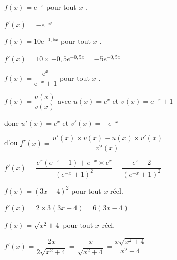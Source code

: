 \documentclass[11pt,a4paper]{article}  %
\begin{document}
\begin{enumMet}
	\item $f(x)=\mathrm{e}^{-x}$ pour tout $x$ .
	\begin{corrBox}
		$f'(x)=-e^{-x}$		
	\end{corrBox}
	\item $f(x)=10 \mathrm{e}^{-0,5 x}$ pour tout $x$ .
	\begin{corrBox}
		$f'(x)=10\times -0,5e^{-0,5x}=-5e^{-0,5x}$		
	\end{corrBox}
	\item $f(x)=\dfrac{\mathrm{e}^x}{\mathrm{e}^{-x}+1}$ pour tout $x$ .
	\begin{corrBox}
		$f(x)=\dfrac{u(x)}{v(x)}$ avec $u(x)=e^x$ et $v(x)=e^{-x}+1$
		
		donc $u'(x)=e^x$ et $v'(x)=-e^{-x}$
		
		d'ou $f'(x)=\dfrac{u'(x)\times v(x)-u(x)\times v'(x)}{v^2(x)}$
		
		$f'(x)=\dfrac{e^x(e^{-x}+1)+e^{-x}\times e^x}{(e^{-x}+1)^2}=\dfrac{e^x+2}{(e^{-x}+1)^2}$	
	\end{corrBox}
\end{enumMet}


\begin{enumMet}
	\item $f(x)=(3 x-4)^2$ pour tout $x$ réel.
	\begin{corrBox}
		$f'(x)=2\times 3(3x-4)=6(3x-4)$		
	\end{corrBox}
	\item $f(x)=\sqrt{x^2+4}$ pour tout $x$ réel.
	\begin{corrBox}
		$f'(x)=\dfrac{2x}{2\sqrt{x^2+4}}=\dfrac{x}{\sqrt{x^2+4}}=\dfrac{x\sqrt{x^2+4}}{x^2+4}$		
	\end{corrBox}
\end{enumMet}

\end{document}
